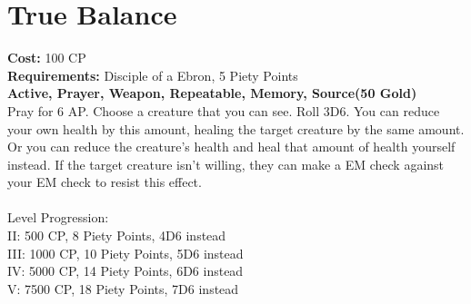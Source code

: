 \section{True Balance}
\textbf{Cost:} 100 CP\\
\textbf{Requirements:} Disciple of a Ebron, 5 Piety Points \\
\textbf{Active, Prayer, Weapon, Repeatable, Memory, Source(50 Gold)}\\
Pray for 6 AP. Choose a creature that you can see. Roll 3D6. You can reduce your own health by this amount, healing the target creature by the same amount. Or you can reduce the creature's health and heal that amount of health yourself instead. If the target creature isn't willing, they can make a EM check against your EM check to resist this effect.\\
\\
Level Progression:\\
II: 500 CP, 8 Piety Points, 4D6 instead\\
III: 1000 CP, 10 Piety Points, 5D6 instead\\
IV: 5000 CP, 14 Piety Points, 6D6 instead\\
V: 7500 CP, 18 Piety Points, 7D6 instead\\